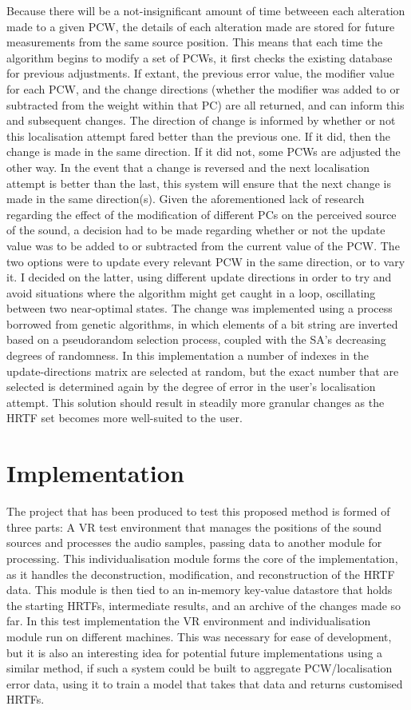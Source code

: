 Because there will be a not-insignificant amount of time betweeen each alteration made to a given PCW, the details of each alteration made are stored for future measurements from the same source position. This means that each time the algorithm begins to modify a set of PCWs, it first checks the existing database for previous adjustments. If extant, the previous error value, the modifier value for each PCW, and the change directions (whether the modifier was added to or subtracted from the weight within that PC) are all returned, and can inform this and subsequent changes. The direction of change is informed by whether or not this localisation attempt fared better than the previous one. If it did, then the change is made in the same direction. If it did not, some PCWs are adjusted the other way. In the event that a change is reversed and the next localisation attempt is better than the last, this system will ensure that the next change is made in the same direction(s). Given the aforementioned lack of research regarding the effect of the modification of different PCs on the perceived source of the sound, a decision had to be made regarding whether or not the update value was to be added to or subtracted from the current value of the PCW. The two options were to update every relevant PCW in the same direction, or to vary it. I decided on the latter, using different update directions in order to try and avoid situations where the algorithm might get caught in a loop, oscillating between two near-optimal states. The change was implemented using a process borrowed from genetic algorithms\citep{Whitley1994}, in which elements of a bit string are inverted based on a pseudorandom selection process, coupled with the SA's decreasing degrees of randomness. In this implementation a number of indexes in the update-directions matrix are selected at random, but the exact number that are selected is determined again by the degree of error in the user's localisation attempt. This solution should result in steadily more granular changes as the HRTF set becomes more well-suited to the user. 

\section{Implementation}
The project that has been produced to test this proposed method is formed of three parts: A VR test environment that manages the positions of the sound sources and processes the audio samples, passing data to another module for processing. This individualisation module forms the core of the implementation, as it handles the deconstruction, modification, and reconstruction of the HRTF data. This module is then tied to an in-memory key-value datastore that holds the starting HRTFs, intermediate results, and an archive of the changes made so far. In this test implementation the VR environment and individualisation module run on different machines. This was necessary for ease of development, but it is also an interesting idea for potential future implementations using a similar method, if such a system could be built to aggregate PCW/localisation error data, using it to train a model that takes that data and returns customised HRTFs. 

